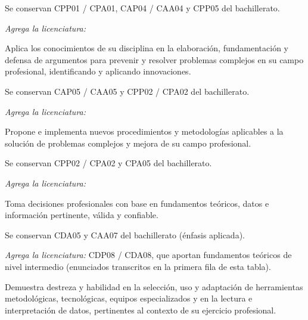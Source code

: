 \documentclass[11pt,a4paper]{article}
\begin{document}
{Se conservan CPP01 / CPA01, CAP04 / CAA04 y CPP05 del bachillerato.\par
 \textit{Agrega la licenciatura:}\par
 }
{Aplica los conocimientos de su disciplina en la elaboración, fundamentación y defensa de argumentos para prevenir y resolver problemas complejos en su campo profesional, identificando y aplicando innovaciones.}
{Se conservan CAP05 / CAA05 y CPP02 / CPA02 del bachillerato.\par
 \textit{Agrega la licenciatura:}\par
 }
{Propone e implementa nuevos procedimientos y metodologías aplicables a la solución de problemas complejos y mejora de su campo profesional.}
{Se conservan CPP02 / CPA02 y CPA05 del bachillerato.\par
 \textit{Agrega la licenciatura:}\par
 }
{Toma decisiones profesionales con base en fundamentos teóricos, datos e información pertinente, válida y confiable.}
{Se conservan CDA05 y CAA07 del bachillerato (énfasis aplicada).\par
 \textit{Agrega la licenciatura:} CDP08 / CDA08, que aportan fundamentos teóricos de nivel intermedio (enunciados transcritos en la primera fila de esta tabla).}
{Demuestra destreza y habilidad en la selección, uso y adaptación de herramientas metodológicas, tecnológicas, equipos especializados y en la lectura e interpretación de datos, pertinentes al contexto de su ejercicio profesional.}
\end{document}
